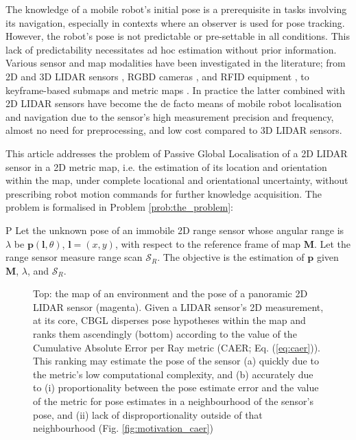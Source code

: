 The knowledge of a mobile robot's initial pose is a prerequisite in tasks
involving its navigation, especially in contexts where an observer is used for
pose tracking. However, the robot's pose is not predictable or pre-settable in
all conditions. This lack of predictability necessitates ad hoc estimation
without prior information. Various sensor and map modalities have been
investigated in the literature; from 2D and 3D LIDAR sensors
\cite{als_eth,Cop2018a}, RGBD cameras \cite{Guo2016}, and RFID equipment
\cite{Tzitzis2023b}, to keyframe-based submaps \cite{Lowry2016} and metric maps
\cite{Rosen2021}. In practice the latter combined with 2D LIDAR sensors have
become the de facto means of mobile robot localisation and navigation due to
the sensor's high measurement precision and frequency, almost no need for
preprocessing, and low cost compared to 3D LIDAR sensors.

This article addresses the problem of Passive Global Localisation of a 2D LIDAR
sensor in a 2D metric map, i.e. the estimation of its location and orientation
within the map, under complete locational and orientational uncertainty,
without prescribing robot motion commands
for further knowledge acquisition. The problem is
formalised in Problem \ref{prob:the_problem}:

\begin{customprb}{P}
  \label{prob:the_problem}
  Let the unknown pose of an immobile 2D range sensor whose angular range is
  $\lambda$ be $\bm{p}(\bm{l},\theta)$, $\bm{l} = (x,y)$, with respect to the
  reference frame of map $\bm{M}$. Let the range sensor measure range scan
  $\mathcal{S}_R$. The objective is the estimation of $\bm{p}$ given $\bm{M}$,
  $\lambda$, and $\mathcal{S}_R$.
\end{customprb}

\begin{figure}\vspace{0.4em}
  
  \vspace{-1.65cm}
  \caption{\small Top: the map of an environment and the pose of a panoramic 2D
           LIDAR sensor (magenta). Given a LIDAR sensor's 2D measurement, at its
           core, CBGL disperses pose hypotheses within the map and ranks them
           ascendingly (bottom) according to the value of the Cumulative
           Absolute Error per Ray metric (CAER; Eq. (\ref{eq:caer})). This
           ranking may estimate the pose of the sensor (a) quickly due to the
           metric's low computational complexity, and (b) accurately due to (i)
           proportionality between the pose estimate error and the value of the
           metric for pose estimates in a neighbourhood of the sensor's pose,
           and (ii) lack of disproportionality outside of that neighbourhood
           (Fig. \ref{fig:motivation_caer})
           }
  \label{fig:face}
\end{figure}

